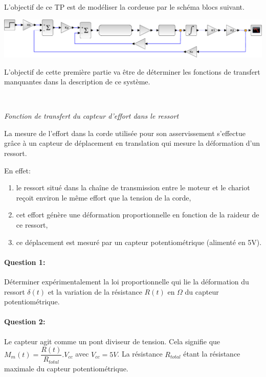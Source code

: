 

\ifdef{\public}{\cleardoublepage}{}



L'objectif de ce TP est de modéliser la cordeuse par le schéma blocs suivant.

\begin{center}
 \includegraphics[width=0.95\linewidth]{img/Cordeuse}
\end{center}

L'objectif de cette première partie va être de déterminer les fonctions de transfert manquantes dans la description de ce système.

~\

\textit{Fonction de transfert du capteur d'effort dans le ressort}

La mesure de l'effort dans la corde utilisée pour son asservissement s'effectue grâce à un capteur de déplacement en translation qui 
mesure la déformation d'un ressort.

En effet:
\begin{enumerate}
 \item le ressort situé dans la chaîne de transmission entre le moteur et le chariot reçoit environ le même effort que la tension de la corde,
 \item cet effort génère une déformation proportionnelle en fonction de la raideur de ce ressort,
 \item ce déplacement est mesuré par un capteur potentiométrique (alimenté en 5V).
\end{enumerate}

\paragraph{Question 1:} Déterminer expérimentalement la loi proportionnelle qui lie la déformation du ressort $\delta(t)$ et la variation de la résistance $R(t)$ en $\Omega$ du capteur potentiométrique.

\paragraph{Question 2:} Le capteur agit comme un pont diviseur de tension. Cela signifie que $M_m(t)=\dfrac{R(t)}{R_{total}}.V_{cc}$ avec $V_{cc}=5V$. La résistance $R_{total}$ étant la résistance maximale du capteur potentiométrique.

